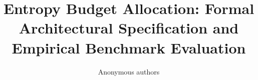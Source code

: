 \title{\textbf{Entropy Budget Allocation: Formal Architectural Specification and Empirical Benchmark Evaluation}}

\author{Anonymous authors}
